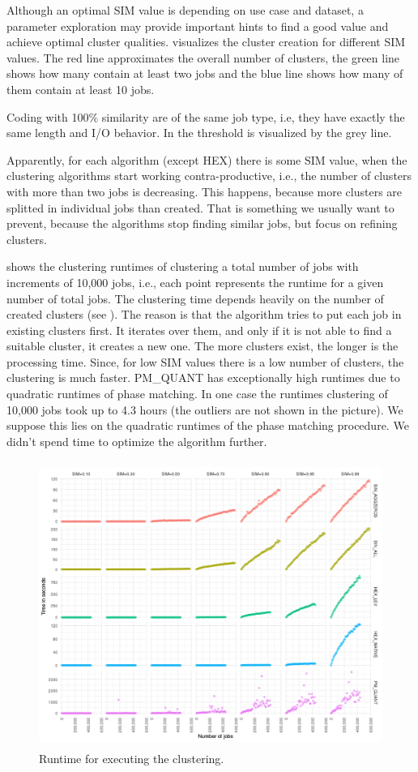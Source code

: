 \documentclass[]{llncs}
\begin{document}
Although an optimal SIM value is depending on use case and dataset, a parameter exploration may provide important hints to find a good value and achieve optimal cluster qualities.
 visualizes the cluster creation for different SIM values.
The red line approximates the overall number of clusters, the green line shows how many contain at least two jobs and the blue line shows how many of them contain at least 10 jobs.

Coding with 100$\%$  similarity are of the same job type, i.e, they have exactly the same length and I/O behavior.
In  the threshold is visualized by the grey line.

Apparently, for each algorithm (except HEX) there is some SIM value, when the clustering algorithms start working contra-productive, i.e., the number of clusters with more than two jobs is decreasing.
This happens, because more clusters are splitted in individual jobs than created.
That is something we usually want to prevent, because the algorithms stop finding similar jobs, but focus on refining clusters.

 shows the clustering runtimes of clustering a total number of jobs with increments of 10,000 jobs, i.e., each point represents the runtime for a given number of total jobs.
The clustering time depends heavily on the number of created clusters (see ).
The reason is that the algorithm tries to put each job in existing clusters first.
It iterates over them, and only if it is not able to find a suitable cluster, it creates a new one.
The more clusters exist, the longer is the processing time.
Since, for low SIM values there is a low number of clusters, the clustering is much faster.
PM\_QUANT has exceptionally high runtimes due to quadratic runtimes of phase matching.
In one case the runtimes clustering of 10,000 jobs took up to 4.3 hours (the outliers are not shown in the picture).
We suppose this lies on the quadratic runtimes of the phase matching procedure.
We didn't spend time to optimize the algorithm further.

\begin{figure}
  \centering
  \includegraphics[width=4.61in,height=3.68in]{./media/image18.png}
  \caption{Runtime for executing the clustering.}
  \label{fig:alg_runtimes}
\end{figure}
\end{document}
